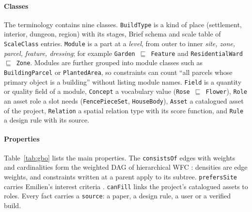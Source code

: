 \documentclass[conference]{IEEEtran}
\begin{document}
\paragraph{Classes} The terminology contains nine classes. \texttt{BuildType} is a kind
of place (settlement, interior, dungeon, region) with its stages, Brief schema and scale
table of \texttt{ScaleClass} entries. \texttt{Module} is a part at a \emph{level}, from
outer to inner \emph{site, zone, parcel, feature, dressing}; for example
\texttt{Garden}~$\sqsubseteq$~\texttt{Feature} and
\texttt{ResidentialWard}~$\sqsubseteq$~\texttt{Zone}. Modules are further grouped into
module classes such as \texttt{BuildingParcel} or \texttt{PlantedArea}, so constraints can
count ``all parcels whose primary object is a building'' without listing module names.
\texttt{Field} is a quantity or quality field of a module, \texttt{Concept} a vocabulary
value (\texttt{Rose}~$\sqsubseteq$~\texttt{Flower}), \texttt{Role} an asset role a slot
needs (\texttt{FencePieceSet}, \texttt{HouseBody}), \texttt{Asset} a catalogued asset of
the project, \texttt{Relation} a spatial relation type with its score function, and
\texttt{Rule} a design rule with its source.

\paragraph{Properties} Table~\ref{tab:gbo} lists the main properties. The
\texttt{consistsOf} edges with weights and cardinalities form the weighted DAG of
hierarchical WFC \cite{alaka2023}: densities are edge weights, and constraints written
at a parent apply to its subtree. \texttt{prefersSite} carries Emilien's interest
criteria \cite{emilien2012}. \texttt{canFill} links the project's catalogued assets to
roles. Every fact carries a \texttt{source}: a paper, a design rule, a user or a
verified build.
\end{document}
